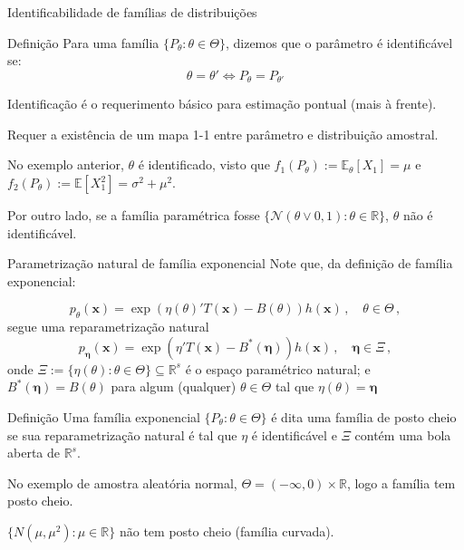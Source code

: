 \documentclass[11pt]{beamer}
\newenvironment{halfwideitemize}{\itemize\addtolength{\itemsep}{0.5em}}{\enditemize}
\begin{document}
	\begin{frame}{Identificabilidade de famílias de distribuições}
		\begin{block}{Definição}
			Para uma família $\{P_\theta: \theta \in \Theta\}$, dizemos que o parâmetro é identificável se:
			$$\theta = \theta' \iff P_{\theta} = P_{\theta'}$$
		\end{block}
		\begin{halfwideitemize}
			\item Identificação é o requerimento básico para estimação pontual (mais à frente).
			\begin{halfwideitemize}
				\item Requer a existência de um mapa 1-1 entre parâmetro e distribuição amostral.
			\end{halfwideitemize}
			\item No exemplo anterior, $\theta$ é identificado, visto que $f_1(P_\theta) := \mathbb{E}_\theta[X_1] = \mu$ e $f_2(P_\theta) := \mathbb{E}[X_1^2] = \sigma^2 + \mu^2$.
			\item Por outro lado, se a família paramétrica fosse $\{\mathcal{N}( \theta \lor 0, 1): \theta \in \mathbb{R}\}$, $\theta$ não é identificável.
		\end{halfwideitemize}
	\end{frame}
	\begin{frame}{Parametrização natural de família exponencial}
		Note que, da definição de família exponencial:
		
		$$p_\theta(\boldsymbol{x}) = \exp(\eta(\theta)'T(\boldsymbol{x}) -B(\theta)) h(\boldsymbol{x}) \, , \quad  \theta \in \Theta \, ,$$
		segue uma reparametrização {\color{blue}natural}
		$$p_{\boldsymbol{\eta}}(\boldsymbol{x}) = \exp(\eta'T(\boldsymbol{x}) -B^*(\boldsymbol{\eta})) h(\boldsymbol{x}) \, , \quad \boldsymbol{\eta} \in \Xi \, ,$$
		onde $\Xi := \{ \eta(\theta): \theta \in \Theta\} \subseteq \mathbb{R}^s$ é o {\color{blue}espaço paramétrico natural}; e $B^*(\boldsymbol{\eta}) = B(\theta)$ para algum (qualquer) $\theta \in \Theta$ tal que $\eta(\theta) = \boldsymbol{\eta}$
		
		\begin{block}{Definição}
			Uma família exponencial $\{P_\theta: \theta \in \Theta\}$ é dita uma família de posto cheio se sua reparametrização natural é tal que $\eta$ é identificável e $\Xi$ contém uma bola aberta de $\mathbb{R}^s$.
		\end{block}
		\begin{halfwideitemize}
			\item No exemplo de amostra aleatória normal, $\Theta = (-\infty,0) \times \mathbb{R}$, logo a família tem posto cheio.
			\item $\{N(\mu, \mu^2): \mu \in \mathbb{R}\}$ não tem posto cheio (família curvada).
		\end{halfwideitemize}
	\end{frame}
\end{document}
